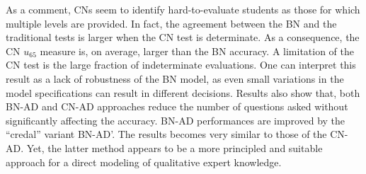 \documentclass[runningheads]{llncs}
\begin{document}
	
	As a comment, CNs seem to identify hard-to-evaluate students as those for which 
	multiple levels are provided. In fact, the agreement between the BN and the traditional 
	tests is larger when the CN test is determinate. As a consequence, the CN $u_{65}$ 
	measure is, on average, larger than the BN accuracy. 
	A limitation of the CN test is the large fraction of indeterminate evaluations. One can 
	interpret this result as a lack of robustness of the BN model, as even small variations in 
	the model specifications can result in different decisions. Results also show that, both 
	BN-AD and CN-AD approaches reduce the number of questions asked without 
	significantly affecting the accuracy. BN-AD performances are improved by the ``credal'' 
	variant BN-AD'. The results becomes very similar to those of the CN-AD. Yet, the latter 
	method appears to be a more principled and suitable approach for a direct modeling of 
	qualitative expert knowledge. 
	
	
	
	
	
	
\end{document}
